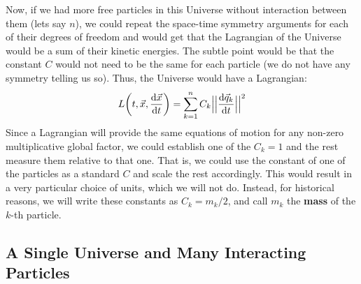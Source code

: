 \documentclass[11pt, a4paper]{article} %
\begin{document}
Now, if we had more free particles in this Universe without interaction between them (lets say $n$), we could repeat the space-time symmetry arguments for each of their degrees of freedom and would get that the Lagrangian of the Universe would be a sum of their kinetic energies. The subtle point would be that the constant $C$ would not need to be the same for each particle (we do not have any symmetry telling us so). Thus, the Universe would have a Lagrangian:
\begin{equation}
L\qty(t, \vec{x}, \dv{\vec{x}}{t})=\sum_{k=1}^n C_k\Big|\Big|\dv{\vec{q}_k}{t}\Big|\Big|^2
\end{equation}
Since a Lagrangian will provide the same equations of motion for any non-zero multiplicative global factor, we could establish one of the $C_k=1$ and the rest measure them relative to that one. That is, we could use the constant of one of the particles as a standard $C$ and scale the rest accordingly. This would result in a very particular choice of units, which we will not do. Instead, for historical reasons, we will write these constants as $C_k=m_k/2$, and call $m_k$ the {\bf mass} of the $k$-th particle.

\subsection*{A Single Universe and Many Interacting Particles}
\end{document}
